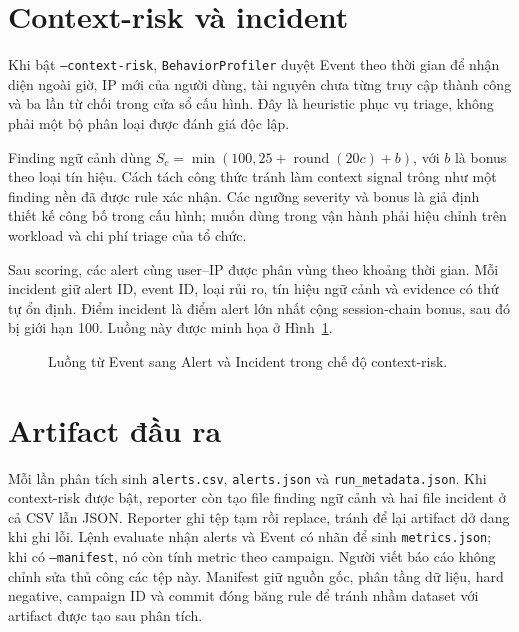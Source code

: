 \section{Context-risk và incident}

Khi bật \texttt{--context-risk}, \texttt{BehaviorProfiler} duyệt Event theo
thời gian để nhận diện ngoài giờ, IP mới của người dùng, tài nguyên chưa từng
truy cập thành công và ba lần từ chối trong cửa sổ cấu hình. Đây là heuristic
phục vụ triage, không phải một bộ phân loại được đánh giá độc lập.

Finding ngữ cảnh dùng $S_c=\min(100,25+\operatorname{round}(20c)+b)$, với
$b$ là bonus theo loại tín hiệu. Cách tách công thức tránh làm context signal
trông như một finding nền đã được rule xác nhận. Các ngưỡng severity và bonus
là giả định thiết kế công bố trong cấu hình; muốn dùng trong vận hành phải hiệu
chỉnh trên workload và chi phí triage của tổ chức.

Sau scoring, các alert cùng user--IP được phân vùng theo khoảng thời gian. Mỗi
incident giữ alert ID, event ID, loại rủi ro, tín hiệu ngữ cảnh và evidence có
thứ tự ổn định. Điểm incident là điểm alert lớn nhất cộng session-chain bonus,
sau đó bị giới hạn 100. Luồng này được minh họa ở Hình~\ref{fig:event-alert}.

\begin{figure}[htbp]
\centering

\caption{Luồng từ Event sang Alert và Incident trong chế độ context-risk.}
\label{fig:event-alert}
\end{figure}

\section{Artifact đầu ra}

Mỗi lần phân tích sinh \texttt{alerts.csv}, \texttt{alerts.json} và
\texttt{run\_metadata.json}. Khi context-risk được bật, reporter còn tạo file
finding ngữ cảnh và hai file incident ở cả CSV lẫn JSON. Reporter ghi tệp tạm
rồi replace, tránh để lại artifact dở dang khi ghi lỗi. Lệnh evaluate nhận
alerts và Event có nhãn để sinh \texttt{metrics.json}; khi có
\texttt{--manifest}, nó còn tính metric theo campaign. Người viết báo cáo không
chỉnh sửa thủ công các tệp này. Manifest giữ nguồn gốc, phân tầng dữ liệu, hard
negative, campaign ID và commit đóng băng rule để tránh nhầm dataset với
artifact được tạo sau phân tích.
